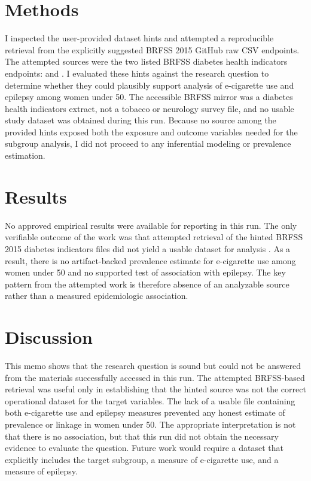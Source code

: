 \documentclass[11pt]{article}
\begin{document}
\section{Methods}
I inspected the user-provided dataset hints and attempted a reproducible retrieval from the explicitly suggested BRFSS 2015 GitHub raw CSV endpoints. The attempted sources were the two listed BRFSS diabetes health indicators endpoints: \cite{ref1} and \cite{ref2}. I evaluated these hints against the research question to determine whether they could plausibly support analysis of e-cigarette use and epilepsy among women under 50. The accessible BRFSS mirror was a diabetes health indicators extract, not a tobacco or neurology survey file, and no usable study dataset was obtained during this run. Because no source among the provided hints exposed both the exposure and outcome variables needed for the subgroup analysis, I did not proceed to any inferential modeling or prevalence estimation.

\section{Results}
No approved empirical results were available for reporting in this run. The only verifiable outcome of the work was that attempted retrieval of the hinted BRFSS 2015 diabetes indicators files did not yield a usable dataset for analysis \cite{ref1} \cite{ref2}. As a result, there is no artifact-backed prevalence estimate for e-cigarette use among women under 50 and no supported test of association with epilepsy. The key pattern from the attempted work is therefore absence of an analyzable source rather than a measured epidemiologic association.

\section{Discussion}
This memo shows that the research question is sound but could not be answered from the materials successfully accessed in this run. The attempted BRFSS-based retrieval was useful only in establishing that the hinted source was not the correct operational dataset for the target variables. The lack of a usable file containing both e-cigarette use and epilepsy measures prevented any honest estimate of prevalence or linkage in women under 50. The appropriate interpretation is not that there is no association, but that this run did not obtain the necessary evidence to evaluate the question. Future work would require a dataset that explicitly includes the target subgroup, a measure of e-cigarette use, and a measure of epilepsy.
\end{document}
